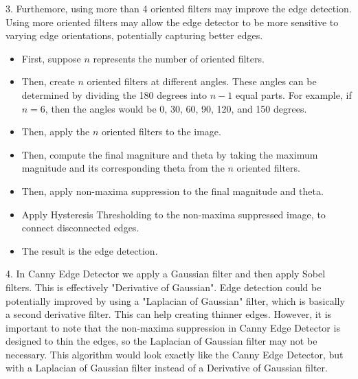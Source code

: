 \documentclass[12pt]{article}
\begin{document}
3. Furthemore, using more than 4 oriented filters may improve the edge detection. Using more oriented filters may allow the edge detector to be more sensitive to varying edge orientations, potentially capturing better edges.
\begin{itemize}
    \item First, suppose $n$ represents the number of oriented filters.
    \item Then, create $n$ oriented filters at different angles. These angles can be determined by dividing the 180 degrees into $n-1$ equal parts. For example, if $n=6$, then the angles would be 0, 30, 60, 90, 120, and 150 degrees.
    \item Then, apply the $n$ oriented filters to the image.
    \item Then, compute the final magniture and theta by taking the maximum magnitude and its corresponding theta from the $n$ oriented filters.
    \item Then, apply non-maxima suppression to the final magnitude and theta.
    \item Apply Hysteresis Thresholding to the non-maxima suppressed image, to connect disconnected edges.
    \item The result is the edge detection.
\end{itemize}
    
4. In Canny Edge Detector we apply a Gaussian filter and then apply Sobel filters. This is effectively "Derivative of Gaussian". Edge detection could be potentially improved by using a "Laplacian of Gaussian" filter, which is basically a second derivative filter. This can help creating thinner edges. However, it is important to note that the non-maxima suppression in Canny Edge Detector is designed to thin the edges, so the Laplacian of Gaussian filter may not be necessary. This algorithm would look exactly like the Canny Edge Detector, but with a Laplacian of Gaussian filter instead of a Derivative of Gaussian filter.
\end{document}
